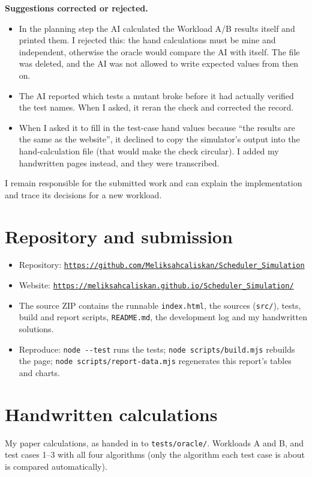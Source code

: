 \documentclass[11pt,a4paper]{article}
\newcommand{\siteurl}{https://meliksahcaliskan.github.io/Scheduler_Simulation/}
\newcommand{\repourl}{https://github.com/Meliksahcaliskan/Scheduler_Simulation}
\begin{document}
\textbf{Suggestions corrected or rejected.}
\begin{itemize}
  \item In the planning step the AI calculated the Workload A/B results itself and printed them. I rejected this: the
    hand calculations must be mine and independent, otherwise the oracle would compare the AI with itself. The file was
    deleted, and the AI was not allowed to write expected values from then on.
  \item The AI reported which tests a mutant broke before it had actually verified the test names. When I asked, it reran
    the check and corrected the record.
  \item When I asked it to fill in the test-case hand values because ``the results are the same as the website'', it
    declined to copy the simulator's output into the hand-calculation file (that would make the check circular). I added
    my handwritten pages instead, and they were transcribed.
\end{itemize}
I remain responsible for the submitted work and can explain the implementation and trace its decisions for a new workload.

\section{Repository and submission}

\begin{itemize}
  \item Repository: \href{\repourl}{\nolinkurl{\repourl}}
  \item Website: \href{\siteurl}{\nolinkurl{\siteurl}}
  \item The source ZIP contains the runnable \texttt{index.html}, the sources (\texttt{src/}), tests, build and report
    scripts, \texttt{README.md}, the development log and my handwritten solutions.
  \item Reproduce: \texttt{node -{}-test} runs the tests; \texttt{node scripts/build.mjs} rebuilds the page;
    \texttt{node scripts/report-data.mjs} regenerates this report's tables and charts.
\end{itemize}

\appendix
\section{Handwritten calculations}\label{app:hand}

My paper calculations, as handed in to \texttt{tests/oracle/}. Workloads A and B, and test cases 1--3 with all four
algorithms (only the algorithm each test case is about is compared automatically).
\end{document}

